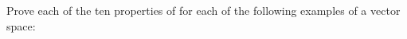 Prove each of the ten properties of  for each of the following examples of a vector space:\\
\\
\\
\\
